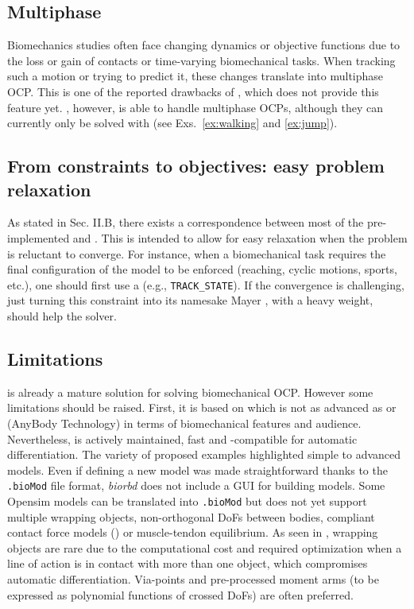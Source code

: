 \subsection{Multiphase}

Biomechanics studies often face changing dynamics or objective functions due to the loss or gain of contacts or time-varying biomechanical tasks.
When tracking such a motion or trying to predict it, these changes translate into multiphase OCP.
This is one of the reported drawbacks of \moco, which does not provide this feature yet.
\bioptim, however, is able to handle multiphase OCPs, although they can currently only be solved with \ipopt (see Exs.~\ref{ex:walking} and \ref{ex:jump}).


\subsection{From constraints to objectives: easy problem relaxation}

As stated in Sec. II.B, there exists a correspondence between most of the pre-implemented \constraints and \objectives.
This is intended to allow for easy relaxation when the problem is reluctant to converge. 
For instance, when a biomechanical task requires the final configuration of the model to be enforced (reaching, cyclic motions, sports, etc.), one should first use a \constraint (e.g., \texttt{TRACK\_STATE}).
If the convergence is challenging, just turning this constraint into its namesake Mayer \objective, with a heavy weight, should help the solver.

\subsection{Limitations}

\bioptim is already a mature solution for solving biomechanical OCP. 
However some limitations should be raised. 
First, it is based on  \biorbd which is not as advanced as \opensim or \anybody (AnyBody Technology) in terms of biomechanical features and audience.
Nevertheless,  \biorbd is actively maintained, fast and \casadi-compatible for automatic differentiation.
The variety of proposed examples highlighted simple to advanced models.
Even if defining a new model was made straightforward thanks to the \texttt{.bioMod} file format, \textit{biorbd} does not include a GUI for building models. 
Some Opensim models can be translated into \texttt{.bioMod} but \biorbd does not yet support multiple wrapping objects, non-orthogonal DoFs between bodies, compliant contact force models (\cite{serrancoli2019subject}) or muscle-tendon equilibrium. 
As seen in \cite{dembia2020opensim}, wrapping objects are rare due to the computational cost and required optimization when a line of action is in contact with more than one object, which compromises automatic differentiation. 
Via-points and pre-processed moment arms \cite{van2011implicit} (to be expressed as polynomial functions of crossed DoFs) are often preferred. 

